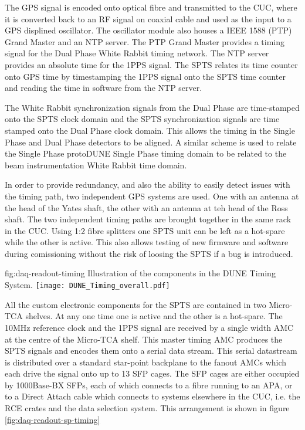 The GPS signal is encoded onto optical fibre and transmitted to the
CUC, where it is converted back to an RF signal on coaxial cable and
used as the input to a GPS displined oscillator. The oscillator module
also houses a IEEE 1588 (PTP) Grand Master and an NTP server. The PTP
Grand Master provides a timing signal for the Dual Phase White Rabbit
timing network. The NTP server provides an absolute time for the 1PPS
signal. The SPTS relates its time counter onto GPS time by
timestamping the 1PPS signal onto the SPTS time counter and reading
the time in software from the NTP server.

The White Rabbit synchronization signals from the Dual Phase are
time-stamped onto the SPTS clock domain and the SPTS synchronization
signals are time stamped onto the Dual Phase clock domain. This allows
the timing in the Single Phase and Dual Phase detectors to be
aligned. A similar scheme is used to relate the Single Phase protoDUNE
Single Phase timing domain to be related to the beam instrumentation
White Rabbit time domain.

In order to provide redundancy, and also the ability to easily detect
issues with the timing path, two independent GPS systems are used. One
with an antenna at the head of the Yates shaft, the other with an
antenna at teh head of the Ross shaft. The two independent timing
paths are brought together in the same rack in the CUC. Using 1:2
fibre splitters one SPTS unit can be left as a hot-spare while the
other is active. This also allows testing of new firmware and software
during comissioning without the risk of loosing the SPTS if a bug is
introduced.


\begin{dunefigure}{fig:daq-readout-timing}
  {Illustration of the components in the DUNE Timing System.}
\texttt{[image: DUNE\_Timing\_overall.pdf]}
\end{dunefigure}

All the custom electronic components for the SPTS are contained in two
Micro-TCA shelves. At any one time one is active and the other is a
hot-spare. The 10MHz reference clock and the 1PPS signal are received
by a single width AMC at the centre of the Micro-TCA shelf. This
master timing AMC produces the SPTS signals and encodes them onto a
serial data stream. This serial datastream is distributed over a
standard star-point backplane to the fanout AMCs which each drive the
signal onto up to 13 SFP cages. The SFP cages are either occupied by
1000Base-BX SFPs, each of which connects to a fibre running to an APA,
or to a Direct Attach cable which connects to systems elsewhere in the
CUC, i.e. the RCE crates and the data selection system. This arrangement is shown in figure \ref{fig:daq-readout-sp-timing}


